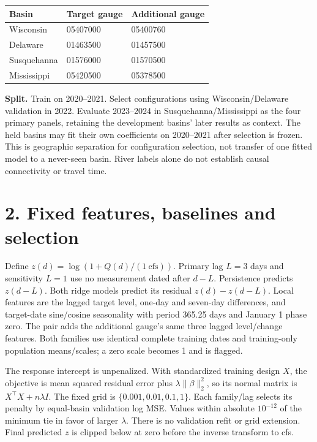 \documentclass[11pt]{article}
\begin{document}
\begin{center}\small
\begin{tabular}{lll}\toprule
Basin & Target gauge & Additional gauge\\\midrule
Wisconsin & 05407000 & 05400760\\
Delaware & 01463500 & 01457500\\
Susquehanna & 01576000 & 01570500\\
Mississippi & 05420500 & 05378500\\\bottomrule
\end{tabular}\end{center}

\textbf{Split.} Train on 2020--2021. Select configurations using Wisconsin/Delaware validation in 2022. Evaluate 2023--2024 in Susquehanna/Mississippi as the four primary panels, retaining the development basins' later results as context. The held basins may fit their own coefficients on 2020--2021 after selection is frozen. This is geographic separation for configuration selection, not transfer of one fitted model to a never-seen basin. River labels alone do not establish causal connectivity or travel time.

\clearpage
\section*{2. Fixed features, baselines and selection}
Define $z(d)=\log(1+Q(d)/(1\ \mathrm{cfs}))$. Primary lag $L=3$ days and sensitivity $L=1$ use no measurement dated after $d-L$. Persistence predicts $z(d-L)$. Both ridge models predict its residual $z(d)-z(d-L)$. Local features are the lagged target level, one-day and seven-day differences, and target-date sine/cosine seasonality with period 365.25 days and January 1 phase zero. The pair adds the additional gauge's same three lagged level/change features. Both families use identical complete training dates and training-only population means/scales; a zero scale becomes 1 and is flagged.

The response intercept is unpenalized. With standardized training design $X$, the objective is mean squared residual error plus $\lambda\|\beta\|_2^2$, so its normal matrix is $X^\top X+n\lambda I$. The fixed grid is $\{0.001,0.01,0.1,1\}$. Each family/lag selects its penalty by equal-basin validation log MSE. Values within absolute $10^{-12}$ of the minimum tie in favor of larger $\lambda$. There is no validation refit or grid extension. Final predicted $z$ is clipped below at zero before the inverse transform to cfs.
\end{document}
